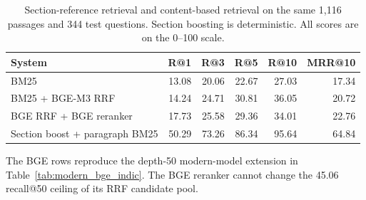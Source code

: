 \documentclass[pdflatex,sn-basic]{sn-jnl}%
\theoremstyle{thmstyleone}%
\theoremstyle{thmstyletwo}%
\theoremstyle{thmstylethree}%
\begin{document}
\begin{table}[!htbp]
    \caption{Section-reference retrieval and content-based retrieval on the
    same 1,116 passages and 344 test questions. Section boosting is
    deterministic. All scores are on the 0--100 scale.}
    \label{tab:citation_aware}
    \centering
    \scriptsize
    \setlength{\tabcolsep}{4pt}
    \begin{tabular}{@{}lrrrrr@{}}
        \toprule
        System & R@1 & R@3 & R@5 & R@10 & MRR@10 \\
        \midrule
        BM25                           & 13.08 & 20.06 & 22.67 & 27.03 & 17.34 \\
        BM25 + BGE-M3 RRF              & 14.24 & 24.71 & 30.81 & 36.05 & 20.72 \\
        BGE RRF + BGE reranker         & 17.73 & 25.58 & 29.36 & 34.01 & 22.76 \\
        \midrule
        Section boost + paragraph BM25 & 50.29 & 73.26 & 86.34 & 95.64 & 64.84 \\
        \bottomrule
    \end{tabular}
    \begin{flushleft}
        {\scriptsize The BGE rows reproduce the depth-50 modern-model
        extension in Table~\ref{tab:modern_bge_indic}. The BGE reranker
        cannot change the 45.06 recall@50 ceiling of its RRF candidate pool.}
    \end{flushleft}
\end{table}
\end{document}

